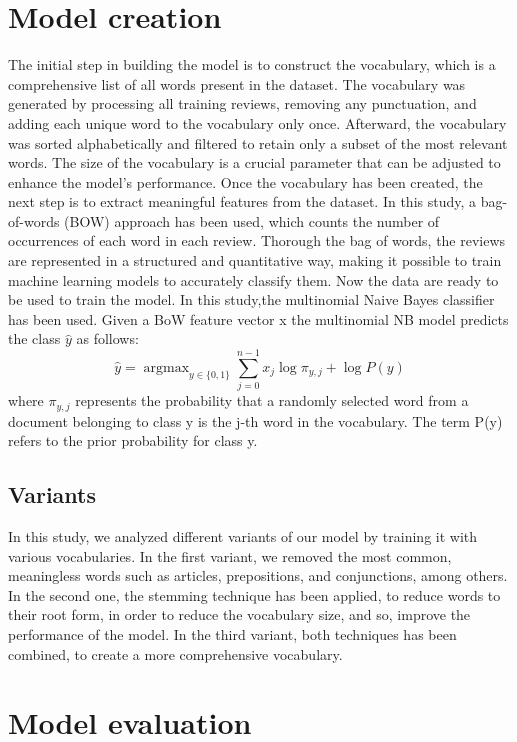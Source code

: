 \documentclass[eng]{class}
\begin{document}
\section{Model creation}
The initial step in building the model is to construct the vocabulary, which is a comprehensive list of all words present in the dataset.
The vocabulary was generated by processing all training reviews, removing any punctuation, and adding each unique word to the vocabulary only once.\newline
Afterward, the vocabulary was sorted alphabetically and filtered to retain only a subset of the most relevant words.
The size of the vocabulary is a crucial parameter that can be adjusted to enhance the model's performance.\newline
Once the vocabulary has been created, the next step is to extract meaningful features from the dataset.
In this study, a bag-of-words (BOW) approach has been used, which counts the number of occurrences of each word in each review.
Thorough the bag of words, the reviews are represented in a structured and quantitative way, making it possible to train machine learning models to accurately classify them.\newline
Now the data are ready to be used to train the model. In this study,the multinomial Naive Bayes classifier has been used.
Given a BoW feature vector x the multinomial NB model predicts the class $\hat{y}$ as follows:
\begin{equation}
  \hat{y} = \mathop{argmax}_{y \in \{0,1\}} \sum_{j=0}^{n-1} x_j \log\pi_{y,j}+\log P(y)
\end{equation}
where $\pi_{y,j}$ represents the probability that a randomly selected word from a document belonging to class y is the j-th word in the vocabulary.
The term P(y) refers to the prior probability for class y.
\subsection{Variants}
In this study, we analyzed different variants of our model by training it with various vocabularies.
In the first variant, we removed the most common, meaningless words such as articles, prepositions, and conjunctions, among others.
In the second one, the stemming technique has been applied, to reduce words to their root form, in order to reduce the vocabulary size, and so, improve the performance of the model.
In the third variant, both techniques has been combined, to create a more comprehensive vocabulary.
\section{Model evaluation}
\end{document}
